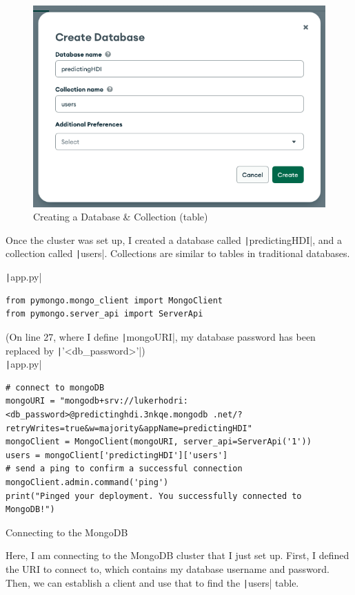 \documentclass[12pt]{report}
\newcommand{\pil}[1]{\protect\texttt|#1|}
\begin{document}
\begin{figure}[H]
\centering
\includegraphics[width=12cm]{ss15.3.png}
\caption{Creating a Database \& Collection (table)}\label{fig:ss15.3}
\end{figure}

Once the cluster was set up, I created a database called \pil{predictingHDI}, and a collection called \pil{users}. Collections are similar to tables in traditional databases.

\begin{listing}[H]
\pil{app.py}
\begin{verbatim}
from pymongo.mongo_client import MongoClient
from pymongo.server_api import ServerApi
\end{verbatim}
(On line 27, where I define \pil{mongoURI}, my database password has been replaced by \pil{'<db_password>'}) \\
\pil{app.py}
\begin{verbatim}
# connect to mongoDB
mongoURI = "mongodb+srv://lukerhodri:<db_password>@predictinghdi.3nkqe.mongodb .net/?retryWrites=true&w=majority&appName=predictingHDI"
mongoClient = MongoClient(mongoURI, server_api=ServerApi('1'))
users = mongoClient['predictingHDI']['users']
# send a ping to confirm a successful connection
mongoClient.admin.command('ping')
print("Pinged your deployment. You successfully connected to MongoDB!")
\end{verbatim}
\caption{Connecting to the MongoDB}\label{cs:connectMongo}
\end{listing}

Here, I am connecting to the MongoDB cluster that I just set up. First, I defined the URI to connect to, which contains my database username and password. Then, we can establish a client and use that to find the \pil{users} table.
\end{document}

